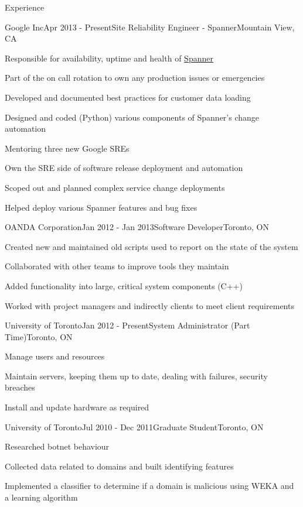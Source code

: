\documentclass{resume}
\begin{document}
  \begin{rSection}{Experience}
    \begin{rSubsection}{Google Inc}{Apr 2013 - Present}{Site Reliability Engineer - Spanner}{Mountain View, CA}
      \item Responsible for availability, uptime and health of \href{https://en.wikipedia.org/wiki/Spanner_(database)}{Spanner}
      \item Part of the on call rotation to own any production issues or emergencies
      \item Developed and documented best practices for customer data loading
      \item Designed and coded (Python) various components of Spanner's change automation
      \item Mentoring three new Google SREs 
      \item Own the SRE side of software release deployment and automation
      \item Scoped out and planned complex service change deployments
      \item Helped deploy various Spanner features and bug fixes
    \end{rSubsection}

    \begin{rSubsection}{OANDA Corporation}{Jan 2012 - Jan 2013}{Software Developer}{Toronto, ON}
      \item Created new and maintained old scripts used to report on the state of the system
      \item Collaborated with other teams to improve tools they maintain
      \item Added functionality into large, critical system components (C++)
      \item Worked with project managers and indirectly clients to meet client requirements
    \end{rSubsection}

    \begin{rSubsection}{University of Toronto}{Jan 2012 - Present}{System Administrator (Part Time)}{Toronto, ON}
      \item Manage users and resources
      \item Maintain servers, keeping them up to date, dealing with failures, security breaches
      \item Install and update hardware as required
    \end{rSubsection}

    \begin{rSubsection}{University of Toronto}{Jul 2010 - Dec 2011}{Graduate Student}{Toronto, ON}
      \item Researched botnet behaviour
      \item Collected data related to domains and built identifying features
      \item Implemented a classifier to determine if a domain is malicious using WEKA and a learning algorithm
    \end{rSubsection}


\end{rSection}
\end{document}
